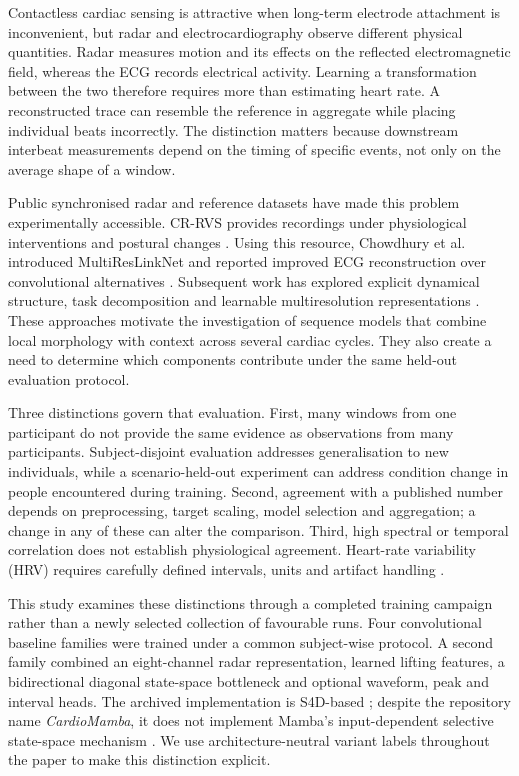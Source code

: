 \documentclass[11pt,a4paper]{article}
\begin{document}
Contactless cardiac sensing is attractive when long-term electrode attachment is inconvenient,
but radar and electrocardiography observe different physical quantities. Radar measures motion
and its effects on the reflected electromagnetic field, whereas the ECG records electrical
activity. Learning a transformation between the two therefore requires more than estimating
heart rate. A reconstructed trace can resemble the reference in aggregate while placing
individual beats incorrectly. The distinction matters because downstream interbeat measurements
depend on the timing of specific events, not only on the average shape of a window.

Public synchronised radar and reference datasets have made this problem experimentally
accessible. CR-RVS provides recordings under physiological interventions and postural changes
\citep{schellenberger2020}. Using this resource, Chowdhury et al. introduced MultiResLinkNet and
reported improved ECG reconstruction over convolutional alternatives \citep{chowdhury2024}.
Subsequent work has explored explicit dynamical structure, task decomposition and learnable
multiresolution representations \citep{radarode,radarodemt,lifwavnet}. These approaches motivate
the investigation of sequence models that combine local morphology with context across several
cardiac cycles. They also create a need to determine which components contribute under the same
held-out evaluation protocol.

Three distinctions govern that evaluation. First, many windows from one participant do not
provide the same evidence as observations from many participants. Subject-disjoint evaluation
addresses generalisation to new individuals, while a scenario-held-out experiment can address
condition change in people encountered during training. Second, agreement with a published
number depends on preprocessing, target scaling, model selection and aggregation; a change in
any of these can alter the comparison. Third, high spectral or temporal correlation does not
establish physiological agreement. Heart-rate variability (HRV) requires carefully defined
intervals, units and artifact handling \citep{hrvstandards,hrvoverview}.

This study examines these distinctions through a completed training campaign rather than a
newly selected collection of favourable runs. Four convolutional baseline families were trained
under a common subject-wise protocol. A second family combined an eight-channel radar
representation, learned lifting features, a bidirectional diagonal state-space bottleneck and
optional waveform, peak and interval heads. The archived implementation is S4D-based
\citep{s4d}; despite the repository name \emph{CardioMamba}, it does not implement Mamba's
input-dependent selective state-space mechanism \citep{mamba}. We use architecture-neutral
variant labels throughout the paper to make this distinction explicit.
\end{document}
